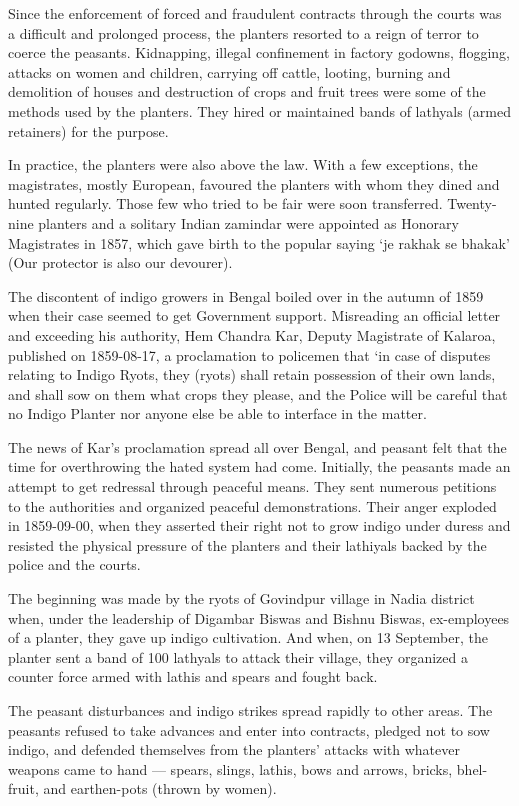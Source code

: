 Since the enforcement of forced and fraudulent contracts through the courts was a difficult and prolonged process, the planters resorted to a reign of terror to coerce the peasants. Kidnapping, illegal confinement in factory godowns, flogging, attacks on women and children, carrying off cattle, looting, burning and demolition of houses and destruction of crops and fruit trees were some of the methods used by the planters. They hired or maintained bands of lathyals (armed retainers) for the purpose.

In practice, the planters were also above the law. With a few exceptions, the magistrates, mostly European, favoured the planters with whom they dined and hunted regularly. Those few who tried to be fair were soon transferred. Twenty-nine planters and a solitary Indian zamindar were appointed as Honorary Magistrates in 1857, which gave birth to the popular saying ‘je rakhak se bhakak’ (Our protector is also our devourer).

The discontent of indigo growers in Bengal boiled over in the autumn of 1859 when their case seemed to get Government support. Misreading an official letter and exceeding his authority, Hem Chandra Kar, Deputy Magistrate of Kalaroa, published on 1859-08-17, a proclamation to policemen that ‘in case of disputes relating to Indigo Ryots, they (ryots) shall retain possession of their own lands, and shall sow on them what crops they please, and the Police will be careful that no Indigo Planter nor anyone else be able to interface in the matter.

The news of Kar’s proclamation spread all over Bengal, and peasant felt that the time for overthrowing the hated system had come. Initially, the peasants made an attempt to get redressal through peaceful means. They sent numerous petitions to the authorities and organized peaceful demonstrations. Their anger exploded in 1859-09-00, when they asserted their right not to grow indigo under duress and resisted the physical pressure of the planters and their lathiyals backed by the police and the courts.

The beginning was made by the ryots of Govindpur village in Nadia district when, under the leadership of Digambar Biswas and Bishnu Biswas, ex-employees of a planter, they gave up indigo cultivation. And when, on 13 September, the planter sent a band of 100 lathyals to attack their village, they organized a counter force armed with lathis and spears and fought back.

The peasant disturbances and indigo strikes spread rapidly to other areas. The peasants refused to take advances and enter into contracts, pledged not to sow indigo, and defended themselves from the planters’ attacks with whatever weapons came to hand — spears, slings, lathis, bows and arrows, bricks, bhel-fruit, and earthen-pots (thrown by women).

